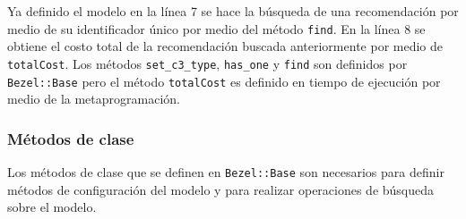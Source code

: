 Ya definido el modelo en la línea 7 se hace la búsqueda de una recomendación por
medio de su identificador único por medio del método \texttt{find}. En la línea 8 se
obtiene el costo total de la recomendación buscada anteriormente por medio de
\texttt{totalCost}. Los métodos \texttt{set\_c3\_type}, \texttt{has\_one} y
\texttt{find} son definidos por \texttt{Bezel::Base} pero el método
\texttt{totalCost} es definido en tiempo de ejecución por medio de la
metaprogramación.

\subsubsection{Métodos de clase}

Los métodos de clase que se definen en \texttt{Bezel::Base} son necesarios para
definir métodos de configuración del modelo y para realizar operaciones
de búsqueda sobre el modelo.



